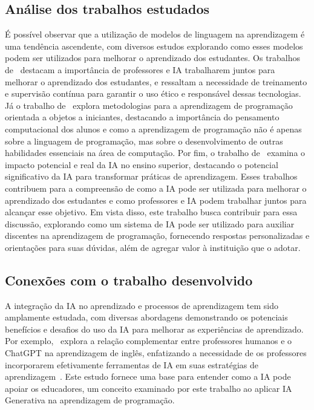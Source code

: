 \documentclass[journal]{IEEEtran}
\begin{document}
\subsection{Análise dos trabalhos estudados}

\noindent%
É possível observar que a utilização de modelos de linguagem na aprendizagem é uma tendência ascendente, com diversos estudos explorando como esses modelos podem ser utilizados para melhorar o aprendizado dos estudantes.
Os trabalhos de~\cite{jeon2023large,kasneci2023chatgpt,da2023chatgpt} destacam a importância de professores e IA trabalharem juntos para melhorar o aprendizado dos estudantes, e ressaltam a necessidade de treinamento e supervisão contínua para garantir o uso ético e responsável dessas tecnologias.
Já o trabalho de~\cite{giraffa2023ensino} explora metodologias para a aprendizagem de programação orientada a objetos a iniciantes, destacando a importância do pensamento computacional dos alunos e como a aprendizagem de programação não é apenas sobre a linguagem de programação, mas sobre o desenvolvimento de outras habilidades essenciais na área de computação.
Por fim, o trabalho de~\cite{bates2020can} examina o impacto potencial e real da IA no ensino superior, destacando o potencial significativo da IA para transformar práticas de aprendizagem.
Esses trabalhos contribuem para a compreensão de como a IA pode ser utilizada para melhorar o aprendizado dos estudantes e como professores e IA podem trabalhar juntos para alcançar esse objetivo.
Em vista disso, este trabalho busca contribuir para essa discussão, explorando como um sistema de IA pode ser utilizado para auxiliar discentes na aprendizagem de programação, fornecendo respostas personalizadas e orientações para suas dúvidas, além de agregar valor à instituição que o adotar.

\subsection{Conexões com o trabalho desenvolvido}

\noindent%
A integração da IA no aprendizado e processos de aprendizagem tem sido amplamente estudada, com diversas abordagens demonstrando os potenciais benefícios e desafios do uso da IA para melhorar as experiências de aprendizado.
Por exemplo,~\cite{jeon2023large} explora a relação complementar entre professores humanos e o ChatGPT na aprendizagem de inglês, enfatizando a necessidade de os professores incorporarem efetivamente ferramentas de IA em suas estratégias de aprendizagem~\cite{jeon2023large}.
Este estudo fornece uma base para entender como a IA pode apoiar os educadores, um conceito examinado por este trabalho ao aplicar IA Generativa na aprendizagem de programação.
\end{document}
